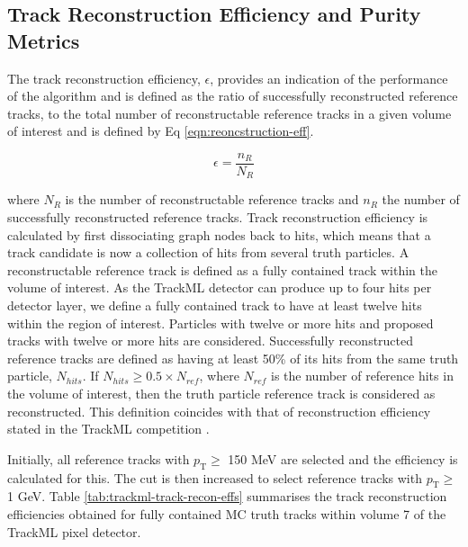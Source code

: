\subsection{Track Reconstruction Efficiency and Purity Metrics}

The track reconstruction efficiency, $\epsilon$, provides an indication of the performance of the algorithm and is defined as the ratio of successfully reconstructed reference tracks, to the total number of reconstructable reference tracks in a given volume of interest and is defined by Eq \eqref{eqn:reoncstruction-eff}. 

\begin{equation}
    \epsilon = \frac{n_R}{N_R}
    \label{eqn:reoncstruction-eff}
\end{equation}

where $N_R$ is the number of reconstructable reference tracks and $n_R$ the number of successfully reconstructed reference tracks. Track reconstruction efficiency is calculated by first dissociating graph nodes back to hits, which means that a track candidate is now a collection of hits from several truth particles. A reconstructable reference track is defined as a fully contained track within the volume of interest. As the TrackML detector can produce up to four hits per detector layer, we define a fully contained track to have at least twelve hits within the region of interest. Particles with twelve or more hits and proposed tracks with twelve or more hits are considered. Successfully reconstructed reference tracks are defined as having at least 50\% of its hits from the same truth particle, $N_{hits}$. If $N_{hits} \geq 0.5 \times N_{ref}$, where $N_{ref}$ is the number of reference hits in the volume of interest, then the truth particle reference track is considered as reconstructed. This definition coincides with that of reconstruction efficiency stated in the TrackML competition \cite{kaggle-trackml}.

Initially, all reference tracks with $p_{\text{T}} \ge$ 150 MeV are selected and the efficiency is calculated for this. The cut is then increased to select reference tracks with $p_{\text{T}} \ge$ 1 GeV. Table \ref{tab:trackml-track-recon-effs} summarises the track reconstruction efficiencies obtained for fully contained MC truth tracks within volume 7 of the TrackML pixel detector.


